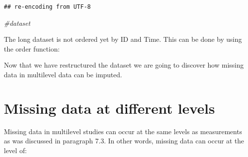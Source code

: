 \documentclass[]{book}
\newenvironment{Shaded}{\begin{snugshade}}{\end{snugshade}}
\newcommand{\KeywordTok}[1]{\textcolor[rgb]{0.13,0.29,0.53}{\textbf{#1}}}
\newcommand{\StringTok}[1]{\textcolor[rgb]{0.31,0.60,0.02}{#1}}
\newcommand{\CommentTok}[1]{\textcolor[rgb]{0.56,0.35,0.01}{\textit{#1}}}
\newcommand{\OperatorTok}[1]{\textcolor[rgb]{0.81,0.36,0.00}{\textbf{#1}}}
\newcommand{\NormalTok}[1]{#1}
\begin{document}
\begin{verbatim}
## re-encoding from UTF-8
\end{verbatim}

\begin{Shaded}
\begin{Highlighting}[]
\CommentTok{#dataset}
\end{Highlighting}
\end{Shaded}

The long dataset is not ordered yet by ID and Time. This can be done by
using the order function:

\begin{Shaded}
\end{Shaded}

Now that we have restructured the dataset we are going to discover how
missing data in multilevel data can be imputed.

\section{Missing data at different
levels}\label{missing-data-at-different-levels-1}

Missing data in multilevel studies can occur at the same levels as
measurements as was discussed in paragraph 7.3. In other words, missing
data can occur at the level of:
\end{document}
